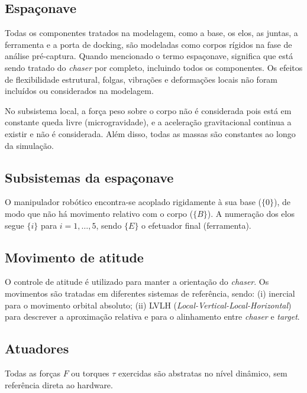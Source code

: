 \subsection{Espaçonave}
Todas os componentes tratados na modelagem, como a base, os elos, as juntas, a ferramenta e a porta de docking, são modeladas como corpos rígidos na fase de análise pré-captura.
Quando mencionado o termo espaçonave, significa que está sendo tratado do \emph{chaser} por completo, incluindo todos os componentes.
Os efeitos de flexibilidade estrutural, folgas, vibrações e deformações locais não foram incluídos ou considerados na modelagem.

No subsistema local, a força peso sobre o corpo não é considerada pois está em constante queda livre (microgravidade), e a aceleração gravitacional continua a existir e não é considerada.
Além disso, todas as massas são constantes ao longo da simulação.

\subsection{Subsistemas da espaçonave}
O manipulador robótico encontra-se acoplado rigidamente à sua base ($\{0\}$), de modo que não há movimento relativo com o corpo ($\{B\}$).
A numeração dos elos segue $\{i\}$ para $i=1,\dots,5$, sendo $\{E\}$ o efetuador final (ferramenta).

\subsection{Movimento de atitude}
O controle de atitude é utilizado para manter a orientação do \emph{chaser}.
Os movimentos são tratadas em diferentes sistemas de referência, sendo:
(i) inercial para o movimento orbital absoluto;
(ii) LVLH (\emph{Local-Vertical-Local-Horizontal}) para descrever a aproximação relativa e para o alinhamento entre \emph{chaser} e \emph{target}.

\subsection{Atuadores}
Todas as forças $F$ ou torques $\tau$ exercidas são abstratas no nível dinâmico, sem referência direta ao hardware.

